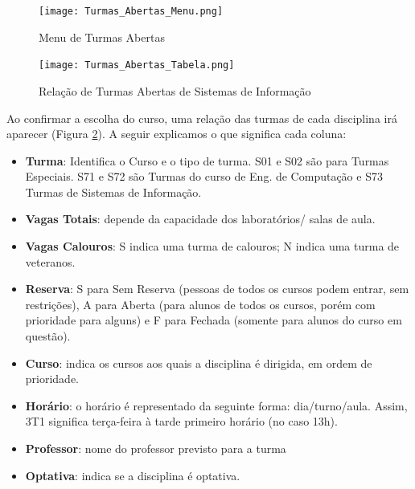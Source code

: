 \documentclass[a4paper,12pt,openany]{article}
\begin{document}
	\begin{figure}[ht!]  \centering
		\texttt{[image: Turmas\_Abertas\_Menu.png]}
		\caption{Menu de Turmas Abertas}
		\label{turmasAbertasMenu}
	\end{figure}

	\begin{figure}[ht!]  \centering
		\texttt{[image: Turmas\_Abertas\_Tabela.png]}
		\caption{Relação de Turmas Abertas de Sistemas de Informação}
		\label{turmasAbertasTabela}
	\end{figure}

\newpage
Ao confirmar a escolha do curso, uma relação das turmas de cada disciplina irá aparecer (Figura \ref{turmasAbertasTabela}). A seguir explicamos o que significa cada coluna:

\newpage
\begin{itemize}
\item \textbf{Turma}: Identifica o Curso e o tipo de turma. S01 e S02 são para Turmas Especiais. S71 e S72 são Turmas do curso de Eng. de Computação e S73 Turmas de Sistemas de Informação.

\item \textbf{Vagas Totais}: depende da capacidade dos laboratórios/ salas de aula.

\item \textbf{Vagas Calouros}: S indica uma turma de calouros; N indica uma turma de veteranos.

\item \textbf{Reserva}: S para Sem Reserva (pessoas de todos os cursos podem entrar, sem restrições), A para Aberta (para alunos de todos os cursos, porém com prioridade para alguns) e F para Fechada (somente para alunos do curso em questão).

\item \textbf{Curso}: indica os cursos aos quais a disciplina é dirigida, em ordem de prioridade.

\item \textbf{Horário}: o horário é representado da seguinte forma: dia/turno/aula. Assim, 3T1 significa terça-feira à tarde primeiro horário (no caso 13h).

\item \textbf{Professor}: nome do professor previsto para a turma

\item \textbf{Optativa}: indica se a disciplina é optativa.

\end{itemize}
\end{document}
